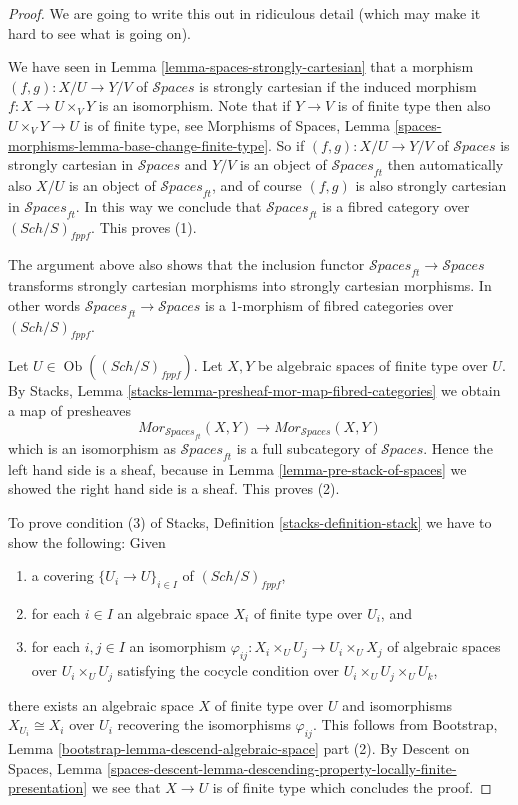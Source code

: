 \documentclass{stacks-project}
\theoremstyle{plain}
\theoremstyle{definition}
\theoremstyle{remark}
\numberwithin{equation}{subsection}
\def\Sch{\mathit{Sch}}
\def\Ob{\mathop{\mathrm{Ob}}\nolimits}
\def\Spacesstack{\mathcal{S}\!\mathit{paces}}
\begin{document}
\begin{proof}
We are going to write this out in ridiculous detail (which may make
it hard to see what is going on).

\medskip\noindent
We have seen in
Lemma \ref{lemma-spaces-strongly-cartesian}
that a morphism $(f, g) : X/U \to Y/V$ of $\Spacesstack$ is
strongly cartesian if the induced morphism $f : X \to U \times_V Y$
is an isomorphism. Note that if $Y \to V$ is of finite type
then also $U \times_V Y \to U$ is of finite type, see
Morphisms of Spaces,
Lemma \ref{spaces-morphisms-lemma-base-change-finite-type}.
So if $(f, g) : X/U \to Y/V$ of $\Spacesstack$ is
strongly cartesian in $\Spacesstack$ and $Y/V$ is an object
of $\Spacesstack_{ft}$ then automatically also $X/U$ is an
object of $\Spacesstack_{ft}$, and of course $(f, g)$ is
also strongly cartesian in $\Spacesstack_{ft}$. In this way
we conclude that $\Spacesstack_{ft}$ is a fibred category over
$(\Sch/S)_{fppf}$. This proves (1).

\medskip\noindent
The argument above also shows that the inclusion
functor $\Spacesstack_{ft} \to \Spacesstack$ transforms
strongly cartesian morphisms into strongly cartesian morphisms.
In other words $\Spacesstack_{ft} \to \Spacesstack$ is
a $1$-morphism of fibred categories over $(\Sch/S)_{fppf}$.

\medskip\noindent
Let $U \in \Ob((\Sch/S)_{fppf})$.
Let $X, Y$ be algebraic spaces of finite type over $U$. By
Stacks, Lemma \ref{stacks-lemma-presheaf-mor-map-fibred-categories}
we obtain a map of presheaves
$$
\mathit{Mor}_{\Spacesstack_{ft}}(X, Y)
\longrightarrow
\mathit{Mor}_{\Spacesstack}(X, Y)
$$
which is an isomorphism as $\Spacesstack_{ft}$ is a full subcategory of
$\Spacesstack$. Hence the left hand side is a sheaf, because in
Lemma \ref{lemma-pre-stack-of-spaces}
we showed the right hand side is a sheaf. This proves (2).

\medskip\noindent
To prove condition (3) of
Stacks, Definition \ref{stacks-definition-stack}
we have to show the following: Given
\begin{enumerate}
\item a covering $\{U_i \to U\}_{i \in I}$ of $(\Sch/S)_{fppf}$,
\item for each $i \in I$ an algebraic space $X_i$ of finite type over $U_i$,
and
\item for each $i, j \in I$ an isomorphism
$\varphi_{ij} : X_i \times_U U_j \to U_i \times_U X_j$ of algebraic spaces
over $U_i \times_U U_j$ satisfying the cocycle condition over
$U_i \times_U U_j \times_U U_k$,
\end{enumerate}
there exists an algebraic space $X$ of finite type over $U$ and isomorphisms
$X_{U_i} \cong X_i$ over $U_i$ recovering the isomorphisms $\varphi_{ij}$.
This follows from
Bootstrap, Lemma \ref{bootstrap-lemma-descend-algebraic-space} part (2). By
Descent on Spaces, Lemma
\ref{spaces-descent-lemma-descending-property-locally-finite-presentation}
we see that $X \to U$ is of finite type which concludes the proof.
\end{proof}
\end{document}
